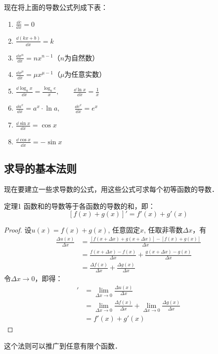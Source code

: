 现在将上面的导数公式列成下表：
\begin{enumerate}
    \item $\frac{\dd c}{\dd x}=0$
    \item $\frac{\dd(kx+b)}{\dd x}=k$
    \item $\frac{\dd x^n}{\dd x}=nx^{n-1}$\quad （$n$为自然数）
    \item $\frac{\dd x^\mu}{\dd x}=\mu x^{\mu-1}$\quad （$\mu$为任意实数）
    \item $\frac{\dd\log_a x}{\dd x}=\frac{\log_a e}{x},\qquad \frac{\dd \ln x}{\dd x}=\frac{1}{x}$
    \item $\frac{\dd a^x}{\dd x}=a^x\cdot \ln a,\qquad \frac{\dd e^x}{\dd x}=e^x$
    \item $\frac{\dd\sin x}{\dd x}=\cos x$
    \item $\frac{\dd \cos x}{\dd x}=-\sin x$
\end{enumerate}

\subsection{求导的基本法则}

现在要建立一些求导数的公式，用这些公式可求每个初等函数的导数．

\begin{blk}
{定理1} 函数和的导数等于各函数的导数的和，即：
\[[f (x) +g (x) ] '=f' (x) +g' (x)\] 
\end{blk}

\begin{proof}
    设$u(x)=f(x)+g(x)$, 任意固定$x$, 任取非零数$\Delta x$，有 
\begin{align*}
    \frac{\Delta u(x)}{\Delta x}&=\frac{[f(x+\Delta x)+g(x+\Delta x)]-[f(x)+g(x)]}{\Delta x}\\
    &=\frac{f(x+\Delta x)-f(x)}{\Delta x}+\frac{g(x+\Delta x)-g(x)}{\Delta x}\\
    &=\frac{\Delta f(x)}{\Delta x}+\frac{\Delta g(x)}{\Delta x}
\end{align*}
令$\Delta x\to 0$，即得：
\begin{align*}
    [f(x)+g(x)]'&=\lim_{\Delta x\to 0}\frac{\Delta u(x)}{\Delta x}\\
    &=\lim_{\Delta x\to 0}\frac{\Delta f(x)}{\Delta x}+\lim_{\Delta x\to 0}\frac{\Delta g(x)}{\Delta x}\\
    &=f'(x)+g'(x)
\end{align*}
\end{proof}

这个法则可以推广到任意有限个函数．

